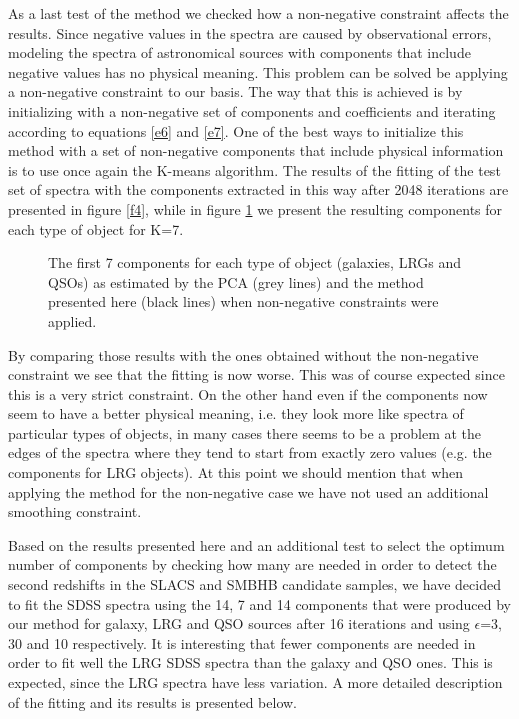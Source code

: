 \documentclass[12pt,preprint]{aastex}
\begin{document}
As a last test of the method we checked how a non-negative constraint affects the results. Since negative values in the spectra are caused by observational errors, modeling the spectra of astronomical sources with components that include negative values has no physical meaning. This problem can be solved be applying a non-negative constraint to our basis. The way that this is achieved is by initializing with a non-negative set of components and coefficients and iterating according to equations \ref{e6} and \ref{e7}. One of the best ways to initialize this method with a set of non-negative components that include physical information is to use once again the K-means algorithm. The results of the fitting of the test set of spectra with the components extracted in this way after 2048 iterations are presented in figure \ref{f4}, while in figure \ref{f5} we present the resulting components for each type of object for K=7.

\begin{figure}[h]
\begin{center}
\caption{The first 7 components for each type of object (galaxies, LRGs and QSOs) as estimated by the PCA (grey lines) and the method presented here (black lines) when non-negative constraints were applied.}
\label{f5}
\end{center}
\end{figure}

By comparing those results with the ones obtained without the non-negative constraint we see that the fitting is now worse. This was of course expected since this is a very strict constraint. On the other hand even if the components now seem to have a better physical meaning, i.e. they look more like spectra of particular types of objects, in many cases there seems to be a problem at the edges of the spectra where they tend to start from exactly zero values (e.g. the components for LRG objects). At this point we should mention that when applying the method for the non-negative case we have not used an additional smoothing constraint.

Based on the results presented here and an additional test to select the optimum number of components by checking how many are needed in order to detect the second redshifts in the SLACS and SMBHB candidate samples, we have decided to fit the SDSS spectra using the 14, 7 and 14 components that were produced by our method for galaxy, LRG and QSO sources after 16 iterations and using $\epsilon$=3, 30 and 10 respectively. It is interesting that fewer components are needed in order to fit well the LRG SDSS spectra than the galaxy and QSO ones. This is expected, since the LRG spectra have less variation. A more detailed description of the fitting and its results is presented below.
\end{document}
